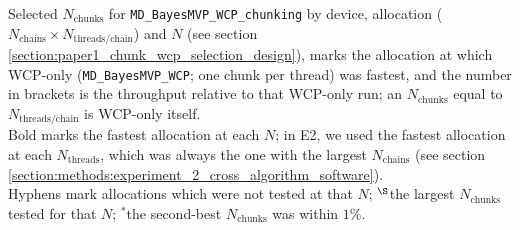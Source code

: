 \begin{table}[H]
{{%
        Selected $N_{\text{chunks}}$ for \texttt{MD\_BayesMVP\_WCP\_chunking}
        by device, allocation ($N_{\text{chains}} \times N_{\text{threads/chain}}$) and $N$
        (see section \ref{section:paper1_chunk_wcp_selection_design}),
        \dag{} marks the allocation at which WCP-only
        (\texttt{MD\_BayesMVP\_WCP}; one chunk per thread) was fastest,
        and the number in brackets is the throughput relative to that WCP-only run;
        an $N_{\text{chunks}}$ equal to $N_{\text{threads/chain}}$ is WCP-only itself. \\
        Bold marks the fastest allocation at each $N$;
        in E2, we used the fastest allocation at each $N_{\text{threads}}$,
        which was always the one with the largest $N_{\text{chains}}$
        (see section \ref{section:methods:experiment_2_cross_algorithm_software}). \\
        Hyphens mark allocations which were not tested at that $N$;
        $^{\S}$the largest $N_{\text{chunks}}$ tested for that $N$;
        $^{*}$the second-best $N_{\text{chunks}}$ was within $1\%$.
}}
\label{S:table:WCP_selected_chunks}
\end{table}
